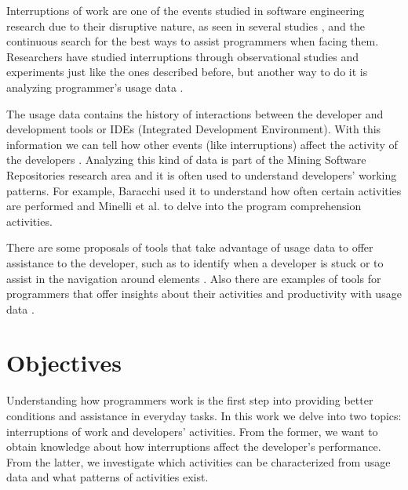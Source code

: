 Interruptions of work are one of the events studied in software engineering research due to their disruptive nature, as seen in several studies \cite{BKC01, BL96, CDT07, AT04}, and the continuous search for the best ways to assist programmers when facing them. Researchers have studied interruptions through observational studies \cite{IH07, LVD06} and experiments \cite{CDT07} just like the ones described before, but another way to do it is analyzing programmer's usage data \cite{SRV15}.

The usage data contains the history of interactions between the developer and development tools or IDEs (Integrated Development Environment). With this information we can tell how other events (like interruptions) affect the activity of the developers \cite{SnipesETALASD}. Analyzing this kind of data is part of the Mining Software Repositories research area \cite{H04} and it is often used to understand developers' working patterns. For example, Baracchi \cite{B14} used it to understand how often certain activities are performed and Minelli et al. \cite{MMLK14} to delve into the program comprehension activities.

\begin{changedforreviewerlong}

There are some proposals of tools that take advantage of usage data to offer assistance to the developer, such as to identify when a developer is stuck \cite{CD10} or to assist in the navigation around elements \cite{KM06}. Also there are examples of tools for programmers that offer insights about their activities and productivity with usage data \cite{CLQ15}.

\end{changedforreviewerlong}




\section{Objectives}
\begin{changedforreviewerlong}
Understanding how programmers work is the first step into providing better conditions and assistance in everyday tasks. In this work we delve into two topics: interruptions of work and developers' activities. From the former, we want to obtain knowledge about how interruptions affect the developer's performance. From the latter, we investigate which activities can be characterized from usage data and what patterns of activities exist.
\end{changedforreviewerlong}
 
